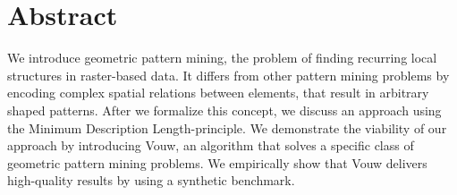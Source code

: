 \documentclass{llncs}
\begin{document}
\section*{Abstract}

We introduce geometric pattern mining, the problem of finding recurring local structures in raster-based data. It differs from other pattern mining problems by encoding complex spatial relations between elements, that result in arbitrary shaped patterns. After we formalize this concept, we discuss an approach using the Minimum Description Length-principle. We demonstrate the viability of our approach by introducing Vouw, an algorithm that solves a specific class of geometric pattern mining problems. We empirically show that Vouw delivers high-quality results by using a synthetic benchmark.
\end{document}
